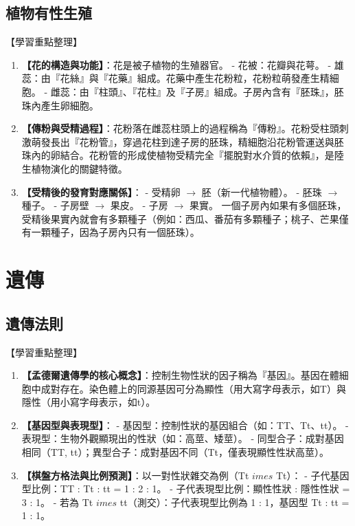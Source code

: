 \documentclass[11pt,a4paper]{article}
\begin{document}
\subsection{植物有性生殖}
\begin{learningpoints}{【學習重點整理】}
\begin{enumerate}[label=\arabic*.]
  \item \textbf{【花的構造與功能】}：花是被子植物的生殖器官。
  - 花被：花瓣與花萼。
  - 雄蕊：由『花絲』與『花藥』組成。花藥中產生花粉粒，花粉粒萌發產生精細胞。
  - 雌蕊：由『柱頭』、『花柱』及『子房』組成。子房內含有『胚珠』，胚珠內產生卵細胞。
  \item \textbf{【傳粉與受精過程】}：花粉落在雌蕊柱頭上的過程稱為『傳粉』。花粉受柱頭刺激萌發長出『花粉管』，穿過花柱到達子房的胚珠，精細胞沿花粉管運送與胚珠內的卵結合。花粉管的形成使植物受精完全『擺脫對水介質的依賴』，是陸生植物演化的關鍵特徵。
  \item \textbf{【受精後的發育對應關係】}：
  - 受精卵 $\rightarrow$ 胚（新一代植物體）。
  - 胚珠 $\rightarrow$ 種子。
  - 子房壁 $\rightarrow$ 果皮。
  - 子房 $\rightarrow$ 果實。
  一個子房內如果有多個胚珠，受精後果實內就會有多顆種子（例如：西瓜、番茄有多顆種子；桃子、芒果僅有一顆種子，因為子房內只有一個胚珠）。
\end{enumerate}
\end{learningpoints}

\newpage
\section{遺傳}
\subsection{遺傳法則}
\begin{learningpoints}{【學習重點整理】}
\begin{enumerate}[label=\arabic*.]
  \item \textbf{【孟德爾遺傳學的核心概念】}：控制生物性狀的因子稱為『基因』。基因在體細胞中成對存在。染色體上的同源基因可分為顯性（用大寫字母表示，如T）與隱性（用小寫字母表示，如t）。
  \item \textbf{【基因型與表現型】}：
  - 基因型：控制性狀的基因組合（如：TT、Tt、tt）。
  - 表現型：生物外觀顯現出的性狀（如：高莖、矮莖）。
  - 同型合子：成對基因相同（TT, tt）；異型合子：成對基因不同（Tt，僅表現顯性性狀高莖）。
  \item \textbf{【棋盤方格法與比例預測】}：以一對性狀雜交為例（Tt $	imes$ Tt）：
  - 子代基因型比例：TT : Tt : tt = 1 : 2 : 1。
  - 子代表現型比例：顯性性狀 : 隱性性狀 = 3 : 1。
  - 若為 Tt $	imes$ tt（測交）：子代表現型比例為 1 : 1，基因型 Tt : tt = 1 : 1。
\end{enumerate}
\end{learningpoints}
\end{document}
